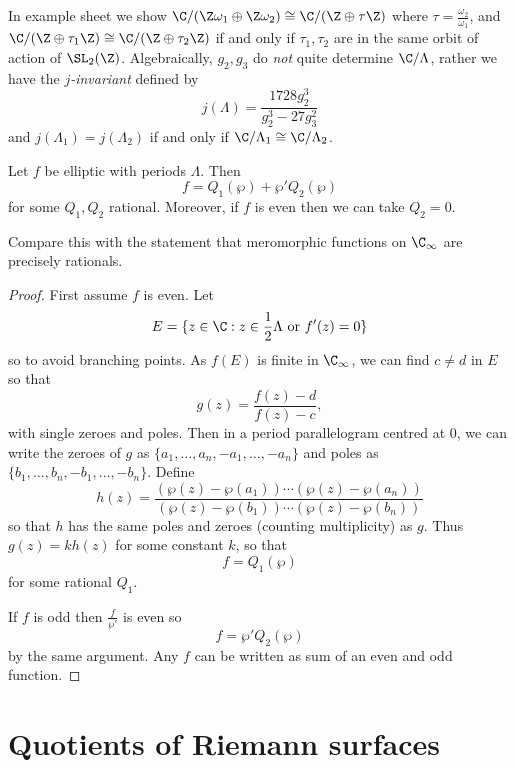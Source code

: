 \documentclass[a4paper]{article}
\begin{document}
\begin{remark}
  In example sheet we show \(\C/(\Z\omega_1 \oplus \Z\omega_2) \cong \C/(\Z \oplus \tau \Z)\) where \(\tau = \frac{\omega_2}{\omega_1}\), and \(\C/(\Z \oplus \tau_1\Z) \cong \C/(\Z \oplus \tau_2\Z)\) if and only if \(\tau_1, \tau_2\) are in the same orbit of action of \(\SL_2(\Z)\). Algebraically, \(g_2, g_3\) do \emph{not} quite determine \(\C/\Lambda\), rather we have the \emph{\(j\)-invariant} defined by
  \[
    j(\Lambda) = \frac{1728g_2^3}{g_2^3 - 27 g_3^2}
  \]
  and \(j(\Lambda_1) = j(\Lambda_2)\) if and only if \(\C/\Lambda_1 \cong \C/\Lambda_2\).
\end{remark}

\begin{theorem}
  Let \(f\) be elliptic with periods \(\Lambda\). Then
  \[
    f = Q_1(\wp) + \wp' Q_2(\wp)
  \]
  for some \(Q_1, Q_2\) rational. Moreover, if \(f\) is even then we can take \(Q_2 = 0\).
\end{theorem}

Compare this with the statement that meromorphic functions on \(\C_\infty\) are precisely rationals.

\begin{proof}
  First assume \(f\) is even. Let
  \[
    E = \{z \in \C: z \in \frac{1}{2} \Lambda \text{ or } f'(z) = 0\}
  \]
  so to avoid branching points. As \(f(E)\) is finite in \(\C_\infty\), we can find \(c \neq d\) in \(E\) so that
  \[
    g(z) = \frac{f(z) - d}{f(z) - c},
  \]
  with single zeroes and poles. Then in a period parallelogram centred at \(0\), we can write the zeroes of \(g\) as \(\{a_1, \dots, a_n, -a_1, \dots, -a_n\}\) and poles as \(\{b_1, \dots, b_n, -b_1, \dots, -b_n\}\). Define
  \[
    h(z) = \frac{(\wp(z) - \wp(a_1)) \cdots (\wp(z) - \wp(a_n))}{(\wp(z) - \wp(b_1)) \cdots (\wp(z) - \wp(b_n))}
  \]
  so that \(h\) has the same poles and zeroes (counting multiplicity) as \(g\). Thus \(g(z) = kh(z)\) for some constant \(k\), so that
  \[
    f = Q_1(\wp)
  \]
  for some rational \(Q_1\).

  If \(f\) is odd then \(\frac{f}{\wp'}\) is even so
  \[
    f = \wp' Q_2(\wp)
  \]
  by the same argument. Any \(f\) can be written as sum of an even and odd function.
\end{proof}

\section{Quotients of Riemann surfaces}
\end{document}
